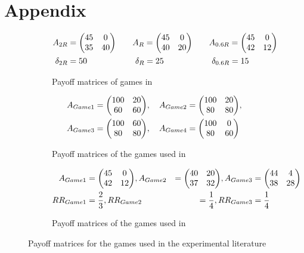 \documentclass[11pt]{article}
\begin{document}
\section{Appendix}
\begin{figure}[H]
\begin{subfigure}{\textwidth}
\caption{Payoff matrices of games in \textcite{battalio_optimization_2001}}
        \label{fig:payoffbattalio}
        \centering
\begin{alignat*}{3}
        A_{2R} &= \mqty(45 & 0 \\ 35 & 40) \quad & &A_{R} = \mqty(45 & 0 \\ 
        40 & 20) \quad & &A_{0.6R} = \mqty( 45 & 0 \\ 42 & 12) \\
        \delta_{2R} &= 50  \quad & &\ \delta_{R} = 25 \quad & &\ \delta_{0.6R} = 15
\end{alignat*}
\end{subfigure}
\vspace*{50px}
\begin{subfigure}{\textwidth}
        \caption{Payoff matrices of the games used in \textcite{schmidt_playing_2003}}
        \centering
\label{fig:payoffschmidt}
\begin{alignat*}{3}
        A_{Game1} = \mqty( 100 & 20 \\ 60 & 60), \quad A_{Game2} 
                               &= \mqty( 100 & 20 \\ 80 & 80), \\ 
        A_{Game3} = \mqty( 100 
             & 60 \\ 80 & 80), \quad A_{Game4} &= \mqty( 100
                             & 0 \\ 80 & 60)
        \end{alignat*}
\end{subfigure}
\vspace{50px}
\begin{subfigure}{\textwidth}
        \caption{Payoff matrices of the games used
        in \textcite{dubois_optimization_2012}}
        \centering
        \label{fig:payoffdubois}
        \begin{alignat*}{3}     
                A_{Game1} &= \mqty(45 & 0 \\ 42 & 12),
                A_{Game2} &= \mqty(40 & 20 \\37 & 32),
                A_{Game3} &= \mqty(44 & 4 \\ 38 & 28) \\
                RR_{Game1}&= \frac 23, RR_{Game2}&=\frac 14, RR_{Game3}&=
                \frac 14
        \end{alignat*}
\end{subfigure}
\caption[Games in the laboratory experiments]{Payoff matrices for the 
games used in the experimental literature}
\end{figure}
\printbibliography
\newpage
\thispagestyle{empty}
\end{document}
